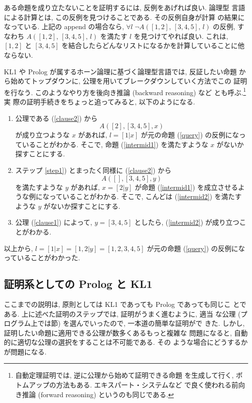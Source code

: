 \documentclass[a4,titlepage]{jsreport}
\begin{document}
ある命題を成り立たないことを証明するには, 反例をあげれば良い.  論理型
言語による計算とは, この反例を見つけることである.  その反例自身が計算
の結果になっている.  上記の append の場合なら, \(\forall l\;\lnot
A([1,2],\, [3,4,5],\,l)\) の反例, すなわち \(A([1,2],\,[3,4,5],\,l)\) 
を満たす \(l\) を見つけてやれば良い.  これは, \([1,2]\) と \([3,4,5]\) 
を結合したらどんなリストになるかを計算していることに他ならない.

KL1 や Prolog が属するホーン論理に基づく論理型言語では, 反証したい命題
から始めてトップダウンに, 公理を用いてブレークダウンしていく方法でこの
証明を行なう.  このようなやり方を後向き推論 (backward reasoning) など
とも呼ぶ.\footnote{自動定理証明では, 逆に公理から始めて証明できる命題
を生成して行く, ボトムアップの方法もある.  エキスパート・システムなど
で良く使われる前向き推論 (forward reasoning) というのも同じである.}実
際の証明手続きをちょっと追ってみると, 以下のようになる.
\begin{enumerate}
\item\label{step1}
公理である (\ref{clause2}) から
\begin{equation}\label{intermid1}
A([2], [3,4,5], x)
\end{equation}
が成り立つような \(x\) があれば, \(l = [1|x]\) が元の命題 
(\ref{query}) の反例になっていることがわかる.  そこで, 命題 
(\ref{intermid1}) を満たすような \(x\) がないか探すことにする.
\item
ステップ \ref{step1}) とまったく同様に (\ref{clause2}) から
\begin{equation}\label{intermid2}
A([], [3,4,5], y)
\end{equation}
を満たすような \(y\) があれば, \(x = [2|y]\) が命題 (\ref{intermid1})
を成立させるような例になっていることがわかる. そこで, こんどは 
(\ref{intermid2}) を満たすような \(y\) がないか探すことにする.
\item
公理 (\ref{clause1}) によって, \(y = [3,4,5]\) としたら,
(\ref{intermid2}) が成り立つことがわかる.
\end{enumerate}
以上から, \(l = [1|x] = [1,2|y] = [1,2,3,4,5]\) が元の命題 
(\ref{query}) の反例になっていることがわかった.

\subsection{証明系としての Prolog と KL1}
ここまでの説明は, 原則としては KL1 であっても Prolog であっても同じこ
とである.  上に述べた証明のステップでは, 証明がうまく進むように, 適当
な公理 (プログラム上では節) を選んでいったので, 一本道の簡単な証明がで
きた.  しかし, 証明したい命題に適用できる公理が数多くあるもっと複雑な
問題になると, 自動的に適切な公理の選択をすることは不可能である.  その
ような場合にどうするかが問題になる.
\end{document}

